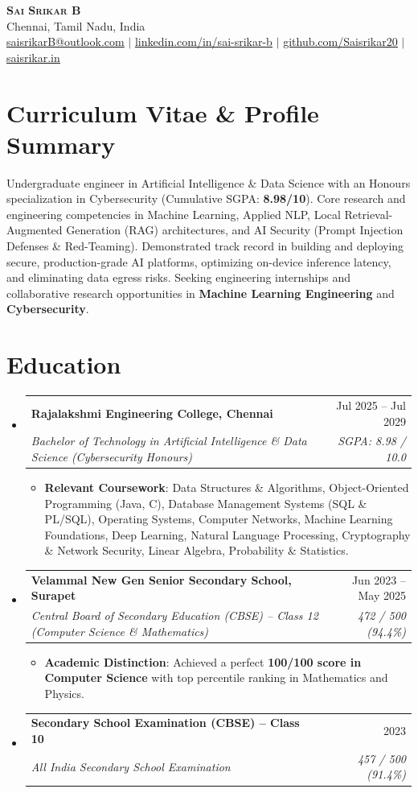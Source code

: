 \documentclass[letterpaper,10pt]{article}
\makeatletter
\newcommand{\resumeItem}[1]{\item\small{#1 \vspace{-2pt}}}
\newcommand{\resumeSubheading}[4]{
  \vspace{-2pt}\item
    \begin{tabular*}{0.98\textwidth}[t]{l@{\extracolsep{\fill}}r}
      \textbf{#1} & #2 \\
      \textit{\small#3} & \textit{\small #4} \\
    \end{tabular*}\vspace{-5pt}
}
\newcommand{\resumeSubHeadingListStart}{\begin{itemize}[leftmargin=0.15in, label={}]}
\newcommand{\resumeSubHeadingListEnd}{\end{itemize}}
\newcommand{\resumeItemListStart}{\begin{itemize}}
\newcommand{\resumeItemListEnd}{\end{itemize}\vspace{-4pt}}
\makeatother
\begin{document}
\begin{center}
  \textbf{\Huge \scshape Sai Srikar B} \\ \vspace{2pt}
  \small
  Chennai, Tamil Nadu, India \\ \vspace{2pt}
  \href{mailto:saisrikarB@outlook.com}{\underline{saisrikarB@outlook.com}} $|$
  \href{https://linkedin.com/in/sai-srikar-b-54b1b8359}{\underline{linkedin.com/in/sai-srikar-b}} $|$
  \href{https://github.com/Saisrikar20}{\underline{github.com/Saisrikar20}} $|$
  \href{https://saisrikar.in}{\underline{saisrikar.in}}
\end{center}

\section{Curriculum Vitae \& Profile Summary}
  \small{Undergraduate engineer in Artificial Intelligence \& Data Science with an Honours specialization in Cybersecurity (Cumulative SGPA: \textbf{8.98/10}). Core research and engineering competencies in Machine Learning, Applied NLP, Local Retrieval-Augmented Generation (RAG) architectures, and AI Security (Prompt Injection Defenses \& Red-Teaming). Demonstrated track record in building and deploying secure, production-grade AI platforms, optimizing on-device inference latency, and eliminating data egress risks. Seeking engineering internships and collaborative research opportunities in \textbf{Machine Learning Engineering} and \textbf{Cybersecurity}.}

\section{Education}
  \resumeSubHeadingListStart
    \resumeSubheading
      {Rajalakshmi Engineering College, Chennai}{Jul 2025 -- Jul 2029}
      {Bachelor of Technology in Artificial Intelligence \& Data Science (Cybersecurity Honours)}{SGPA: 8.98 / 10.0}
      \resumeItemListStart
        \resumeItem{\textbf{Relevant Coursework}: Data Structures \& Algorithms, Object-Oriented Programming (Java, C), Database Management Systems (SQL \& PL/SQL), Operating Systems, Computer Networks, Machine Learning Foundations, Deep Learning, Natural Language Processing, Cryptography \& Network Security, Linear Algebra, Probability \& Statistics.}
      \resumeItemListEnd
    \resumeSubheading
      {Velammal New Gen Senior Secondary School, Surapet}{Jun 2023 -- May 2025}
      {Central Board of Secondary Education (CBSE) -- Class 12 (Computer Science \& Mathematics)}{472 / 500 (94.4\%)}
      \resumeItemListStart
        \resumeItem{\textbf{Academic Distinction}: Achieved a perfect \textbf{100/100 score in Computer Science} with top percentile ranking in Mathematics and Physics.}
      \resumeItemListEnd
    \resumeSubheading
      {Secondary School Examination (CBSE) -- Class 10}{2023}
      {All India Secondary School Examination}{457 / 500 (91.4\%)}
  \resumeSubHeadingListEnd
\end{document}
